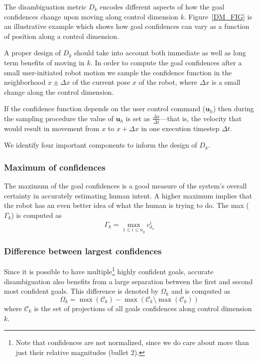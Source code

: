 \documentclass[conference]{IEEEtran}
\begin{document}
The disambiguation metric $D_{k}$ encodes different aspects of how the goal confidences change upon moving along control dimension $k$. Figure~\ref{DM_FIG} is an illustrative example which shows how goal confidences can vary as a function of position along a control dimension. 

A proper design of $D_{k}$ should take into account both immediate as well as long term benefits of moving in $k$. In order to compute the goal confidences after a small user-initiated robot motion we sample the confidence function in the neighborhood $x\pm\Delta x$ of the current pose $x$ of the robot, where $\Delta x$ is a small change along the control dimension. 
	
If the confidence function depends on the user control command ($\boldsymbol{u}_h$) then during the sampling procedure the value of $\boldsymbol{u}_h$ is set as $\frac{\Delta x}{\Delta t}$---that is, the velocity that would result in movement from $x$ to $x + \Delta x$ in one execution timestep $\Delta t$. 

We identify four important components to inform the design of $D_{k}$.
 
\subsubsection{Maximum of confidences}
The maximum of the goal confidences is a good measure of the system's overall certainty in accurately estimating human intent. A higher maximum implies that the robot has an even better idea of what the human is trying to do. The max ($\Gamma_{k}$) is computed as
\begin{equation*}
\Gamma_{k} =\max\limits_{1 \leq i \leq n_g}c^{i}_{\delta_x}
\end{equation*}
\subsubsection{Difference between largest confidences}
Since it is possible to have multiple\footnote{Note that confidences are not normalized, since we do care about more than just their relative magnitudes (bullet 2).} highly confident goals, accurate disambiguation also benefits from a large separation between the first and second most confident goals. 
This difference is denoted by $\Omega_{k}$ and is computed as
\begin{equation*}
\Omega_{k} = \max(\mathcal{C}_k) - \max(\mathcal{C}_k \setminus {\max(\mathcal{C}_k)})
\end{equation*}
where $\mathcal{C}_k$ is the set of projections of all goals confidences along control dimension $k$.
\end{document}
